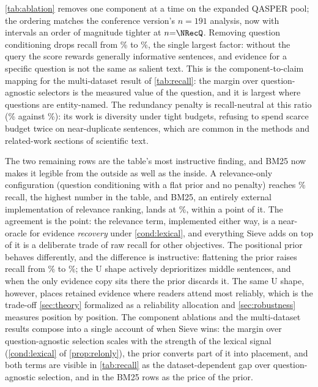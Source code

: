 \documentclass[preprint,12pt]{elsarticle}
\theoremstyle{remark}
\newcommand{\method}{Sieve}
\begin{document}
\autoref{tab:ablation} removes one component at a time on the expanded
QASPER pool; the ordering matches the conference version's $n=191$
analysis, now with intervals an order of magnitude tighter at
$n{=}\NRecQ$. Removing question conditioning drops recall from
\AblSie\% to \AblNoQ\%, the single largest factor: without the query
the score rewards generally informative sentences, and evidence for a
specific question is not the same as salient text. This is the
component-to-claim mapping for the multi-dataset result of
\autoref{tab:recall}: the margin over question-agnostic selectors is
the measured value of the question, and it is largest where questions
are entity-named. The redundancy penalty is recall-neutral at this
ratio (\AblNoRed\% against \AblSie\%): its work is diversity under
tight budgets, refusing to spend scarce budget twice on near-duplicate
sentences, which are common in the methods and related-work sections
of scientific text.

The two remaining rows are the table's most instructive finding, and
BM25 now makes it legible from the outside as well as the inside. A
relevance-only configuration (question conditioning with a flat prior
and no penalty) reaches \AblRelOnly\% recall, the highest number in
the table, and BM25, an entirely external implementation of
relevance ranking, lands at \RecQBm\%, within a point of it. The
agreement is the point: the relevance term, implemented either way,
is a near-oracle for evidence \emph{recovery} under
\autoref{cond:lexical}, and everything \method{} adds on top of it is
a deliberate trade of raw recall for other objectives. The positional
prior behaves differently, and the difference is instructive:
flattening the prior raises recall from \AblSie\% to \AblNoPos\%; the
U shape actively deprioritizes middle sentences, and when the only
evidence copy sits there the prior discards it. The same U shape,
however, places retained evidence where readers attend most reliably,
which is the trade-off \autoref{sec:theory} formalized as a
reliability allocation and \autoref{sec:robustness} measures position
by position. The component ablations and the multi-dataset results
compose into a single account of when \method{} wins: the margin over
question-agnostic selection scales with the strength of the lexical
signal (\autoref{cond:lexical} of \autoref{prop:relonly}), the prior
converts part of it into placement, and both terms are visible in
\autoref{tab:recall} as the dataset-dependent gap over
question-agnostic selection, and in the BM25 rows as the price of
the prior.
\end{document}
